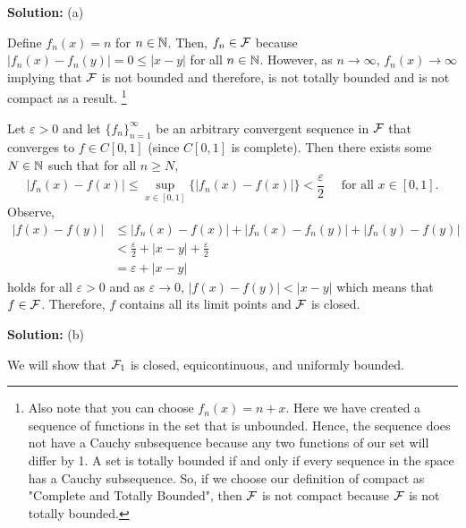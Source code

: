 \documentclass{article}
\begin{document}
\textbf{Solution:} (a) 

Define $f_n(x) = n$ for $n\in \mathbb N$. Then, $f_n\in \mathcal F$ because $|f_n(x) - f_n(y)| = 0 \leq |x-y|$ for all $n\in \mathbb N$. However, as $n\to\infty$, $f_n(x) \to \infty$ implying that $\mathcal F$ is not bounded and therefore, is not totally bounded and is not compact as a result. \footnote{Also note that you can choose $f_n(x) = n+x$. Here we have created a sequence of functions in the set that is unbounded. Hence, the sequence does not have a Cauchy subsequence because any two functions of our set will differ by 1. A set is totally bounded if and only if every sequence in the space has a Cauchy subsequence. So, if we choose our definition of compact as "Complete and Totally Bounded", then $\mathcal F$ is not compact because $\mathcal F$ is not totally bounded.}

Let $\varepsilon > 0$ and let $\{f_n\}_{n=1}^\infty$ be an arbitrary convergent sequence in $\mathcal F$ that converges to $f\in C[0,1]$ (since $C[0,1]$ is complete). Then there exists some $N\in\mathbb N$ such that for all $n\geq N$, 
	\[ |f_n(x) - f(x)| \leq \sup_{x\in [0,1]}\{|f_n(x) - f(x)|\} < \frac{\varepsilon}{2}\quad \text{ for all } x\in [0,1].\]
Observe,
	\begin{align*}
		|f(x) - f(y)| & \leq |f_n(x) - f(x)| + |f_n(x) - f_n(y)| + |f_n(y) - f(y)|\\
				& < \frac{\varepsilon}{2} + |x-y| + \frac{\varepsilon}{2}\\
				& = \varepsilon + |x-y|
	\end{align*}
holds for all $\varepsilon > 0$ and as $\varepsilon \to 0$, $|f(x) - f(y)| < |x-y|$ which means that $f\in \mathcal F$. Therefore, $f$ contains all its limit points and $\mathcal F$ is closed.

\textbf{Solution:} (b) 

We will show that $\mathcal F_1$ is closed, equicontinuous, and uniformly bounded.
\end{document}
